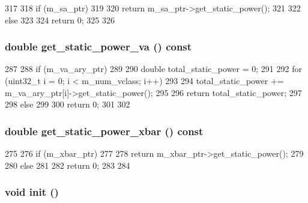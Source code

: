 \begin{DoxyCode}
317 {
318     if (m_sa_ptr)
319     {
320         return m_sa_ptr->get_static_power();
321     }
322     else
323     {
324         return 0;
325     }
326 }
\end{DoxyCode}
\hypertarget{classOrionRouter_a4219f60bb8912ad723dc8549af9b0ee6}{
\subsubsection[{get\_\-static\_\-power\_\-va}]{\setlength{\rightskip}{0pt plus 5cm}double get\_\-static\_\-power\_\-va () const}}
\label{classOrionRouter_a4219f60bb8912ad723dc8549af9b0ee6}



\begin{DoxyCode}
287 {
288     if (m_va_ary_ptr)
289     {
290         double total_static_power = 0;
291 
292         for (uint32_t i = 0; i < m_num_vclass; i++)
293         {
294             total_static_power += m_va_ary_ptr[i]->get_static_power();
295         }
296         return total_static_power;
297     }
298     else
299     {
300         return 0;
301     }
302 }
\end{DoxyCode}
\hypertarget{classOrionRouter_af2bcfbf8f5019a209b658392ed4c540c}{
\subsubsection[{get\_\-static\_\-power\_\-xbar}]{\setlength{\rightskip}{0pt plus 5cm}double get\_\-static\_\-power\_\-xbar () const}}
\label{classOrionRouter_af2bcfbf8f5019a209b658392ed4c540c}



\begin{DoxyCode}
275 {
276     if (m_xbar_ptr)
277     {
278         return m_xbar_ptr->get_static_power();
279     }
280     else
281     {
282         return 0;
283     }
284 }
\end{DoxyCode}
\hypertarget{classOrionRouter_a02fd73d861ef2e4aabb38c0c9ff82947}{
\subsubsection[{init}]{\setlength{\rightskip}{0pt plus 5cm}void init ()}}
\label{classOrionRouter_a02fd73d861ef2e4aabb38c0c9ff82947}



